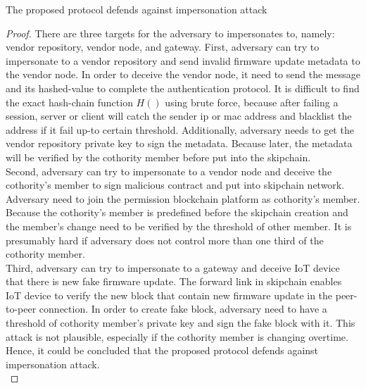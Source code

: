 \begin{theorem}
	The proposed protocol defends against impersonation attack
\end{theorem}
\begin{proof}
	There are three targets for the adversary to impersonates to, namely: vendor repository, vendor node, and gateway. First, adversary can try to impersonate to a vendor repository and send invalid firmware update metadata to the vendor node. In order to deceive the vendor node, it need to send the message and its hashed-value to complete the authentication protocol. It is difficult to find the exact hash-chain function $H()$ using brute force, because after failing a session, server or client will catch the sender ip or mac address and blacklist the address if it fail up-to certain threshold. Additionally, adversary needs to get the vendor repository private key to sign the metadata. Because later, the metadata will be verified by the cothority member before put into the skipchain.\\
	\indent Second, adversary can try to impersonate to a vendor node and deceive the cothority's member to sign malicious contract and put into skipchain network. Adversary need to join the permission blockchain platform as cothority's member. Because the cothority's member is predefined before the skipchain creation and the member's change need to be verified by the threshold of other member. It is presumably hard if adversary does not control more than one third of the cothority member.\\
	\indent Third, adversary can try to impersonate to a gateway and deceive IoT device that there is new fake firmware update. The forward link in skipchain enables IoT device to verify the new block that contain new firmware update in the peer-to-peer connection. In order to create fake block, adversary need to have a threshold of cothority member's private key and sign the fake block with it. This attack is not plausible, especially if the cothority member is changing overtime. Hence, it could be concluded that the proposed protocol defends against impersonation attack.\\
\end{proof}

